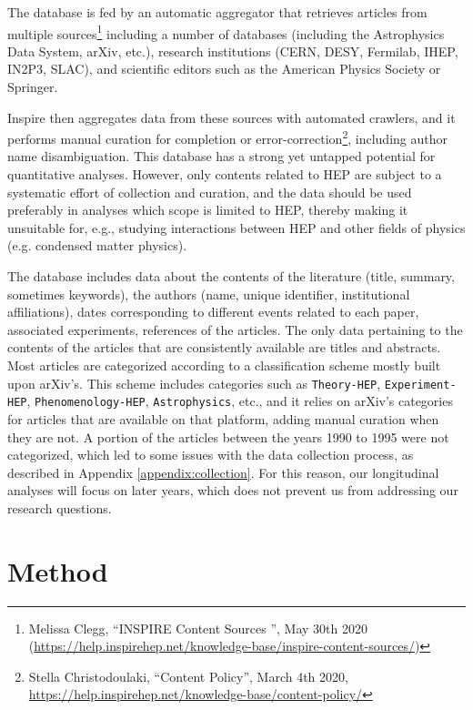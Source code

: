 \documentclass[smallextended]{svjour3}
\begin{document}
The database is fed by an automatic aggregator that retrieves articles from multiple sources\footnote{Melissa Clegg, ``INSPIRE Content Sources
'', May 30th 2020 (\url{https://help.inspirehep.net/knowledge-base/inspire-content-sources/})} including a number of databases (including the Astrophysics Data System, arXiv, etc.), research institutions (CERN, DESY, Fermilab, IHEP, IN2P3, SLAC), and scientific editors such as the American Physics Society or Springer.

Inspire then aggregates data from these sources with automated crawlers, and it performs manual curation for completion or error-correction\footnote{Stella Christodoulaki, ``Content Policy'', March 4th 2020, \url{https://help.inspirehep.net/knowledge-base/content-policy/}}, including author name disambiguation. This database has a strong yet untapped potential for quantitative analyses. However, only contents related to HEP are subject to a systematic effort of collection and curation, and the data should be used preferably in analyses which scope is limited to HEP, thereby making it unsuitable for, e.g., studying interactions between HEP and other fields of physics (e.g. condensed matter physics).%

The database includes data about the contents of the literature (title, summary, sometimes keywords), the authors (name, unique identifier, institutional affiliations), dates corresponding to different events related to each paper, associated experiments, references of the articles. The only data pertaining to the contents of the articles that are consistently available are titles and abstracts. Most articles are categorized according to a classification scheme mostly built upon arXiv's. This scheme includes categories such as \texttt{Theory-HEP}, \texttt{Experiment-HEP}, \texttt{Phenomenology-HEP}, \texttt{Astrophysics}, etc., and it relies on arXiv's categories for articles that are available on that platform, adding manual curation when they are not. A portion of the articles between the years 1990 to 1995 were not categorized, which led to some issues with the data collection process, as described in Appendix \ref{appendix:collection}. For this reason, our longitudinal analyses will focus on later years, which does not prevent us from addressing our research questions.

\section{Method}\label{section:method}
\end{document}
